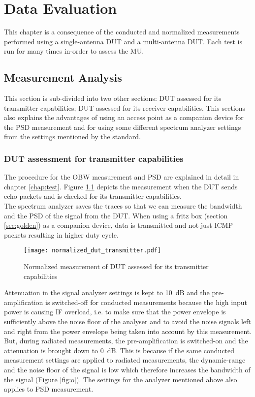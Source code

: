 \chapter{Data Evaluation}\label{chap:de}
This chapter is a consequence of the conducted and normalized measurements performed using a single-antenna \acs{DUT} and a multi-antenna \acs{DUT}. Each test is run for many times in-order to assess the \acf{MU}. 

\section{Measurement Analysis}
This section is sub-divided into two other sections: \acs{DUT} assessed for its transmitter capabilities; \acs{DUT} assessed for its receiver capabilities. This sections also explains the advantages of using an access point as a companion device for the \acf{PSD} measurement and for using some different spectrum analyzer settings from the settings mentioned by the standard.


\subsection{\acs{DUT} assessment for transmitter capabilities} 
The procedure for the \acf{OBW} measurement and \acf{PSD} are explained in detail in chapter \ref{chap:test}. Figure \ref{fig:nt} depicts the measurement when the \acs{DUT} sends echo packets and is checked for its transmitter capabilities. \\

The spectrum analyzer saves the traces so that we can measure the bandwidth and the \acf{PSD} of the signal from the \acs{DUT}. When using a fritz box (section \ref{sec:golden}) as a companion device, data is transmitted and not just \acs{ICMP} packets resulting in higher duty cycle. \\

\begin{figure}[H]
\centering
\texttt{[image: normalized\_dut\_transmitter.pdf]}
\vspace{-2.3cm}
\caption{Normalized measurement of \acs{DUT} assessed for its transmitter capabilities}
\label{fig:nt} 
\end{figure}

Attenuation in the signal analyzer settings is kept to 10~dB and the pre-amplification is switched-off for conducted measurements because the high input power is causing IF overload, i.e. to make sure that the power envelope is sufficiently above the noise floor of the analyser and to avoid the noise signals left and right from the power envelope being taken into account by this measurement. But, during radiated measurements, the pre-amplification is switched-on and the attenuation is brought down to 0~dB. This is because if the same conducted measurement settings are applied to radiated measurements, the dynamic-range and the noise floor of the signal is low which therefore increases the bandwidth of the signal (Figure \ref{fig:o}). The settings for the analyzer mentioned above also applies to \acf{PSD} measurement.


